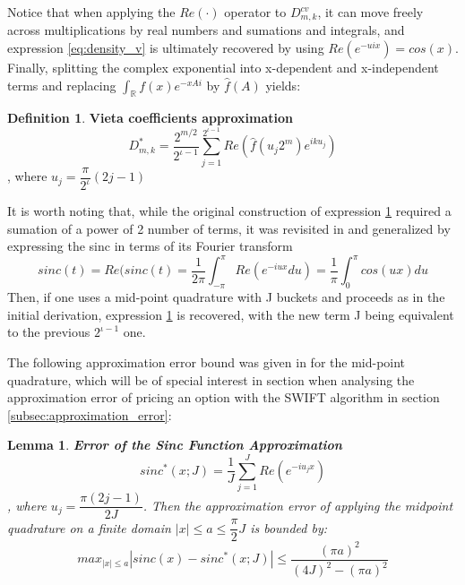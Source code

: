 \documentclass[12,twoside]{mammeTFM}
\newtheorem{lem}[thm]{Lemma}
\theoremstyle{definition}
\newtheorem{definition}[thm]{Definition}
\theoremstyle{remark}
\newcommand{\R}{\ensuremath{\mathbb{R}}}
\begin{document}
\begin{itemize}
{\begin{equation}
\end{equation}
Notice that when applying the $Re(\cdot)$ operator to $D_{m,k}^{cv}$, it can move freely across multiplications by real numbers and sumations and integrals, and expression \ref{eq:density_v} is ultimately recovered by using $Re \left(e^{-uix}\right) = cos(x)$. Finally, splitting the complex exponential into x-dependent and x-independent terms and replacing $\int_{\R} f(x) e^{-xAi}$ by $\hat{f}(A)$ yields:
\begin{definition} \textbf{Vieta coefficients approximation}\label{def:vieta}
\begin{equation}
D_{m,k}^{*} =  \dfrac{2^{m / 2}}{2^{\iota-1}} \sum_{j=1}^{2^{\iota-1}} Re \left( \hat{f} \left(u_j 2^{m} \right) e^{ik u_j} \right)
\end{equation}
, where $u_j = \dfrac{\pi}{2^{\iota}}(2j - 1)$
\end{definition}
}
\end{itemize} 

It is worth noting that, while the original construction of expression \ref{def:vieta} required a sumation of a power of 2 number of terms, it was revisited in \cite{mar17} and generalized by expressing the sinc in terms of its Fourier transform 
\begin{equation}
sinc(t) = Re(sinc(t) = \dfrac{1}{2\pi} \int_{-\pi}^{\pi} Re \left( e^{-iux} du \right) = \dfrac{1}{\pi} \int_{0}^{\pi} cos(ux) du
\end{equation}
Then, if one uses a mid-point quadrature with J buckets and proceeds as in the initial derivation, expression \ref{def:vieta} is recovered, with the new term J being equivalent to the previous $2^{\iota -1}$ one.

The following approximation error bound was given in \cite{mar17} for the mid-point quadrature, which will be of special interest in section when analysing the approximation error of pricing an option with the SWIFT algorithm in section \ref{subsec:approximation_error}:

\begin{lem} \textbf{Error of the Sinc Function Approximation}
\begin{equation} \label{lem:error_sinc}
sinc^{*}(x; J) = \dfrac{1}{J}\sum_{j = 1}^J Re\left( e^{-iu_jx} \right)
\end{equation}
, where $u_j = \dfrac{\pi (2j - 1)}{2J}$. Then the approximation error of applying the midpoint quadrature on a finite domain $|x| \leq a \leq \dfrac{\pi}{2}J$ is bounded by:
\begin{equation}
max_{|x| \leq a} \left|sinc(x) - sinc^{*}(x; J) \right| \leq \dfrac{(\pi a)^2}{(4J)^2 - (\pi a)^2}
\end{equation}
\end{lem}
\end{document}
